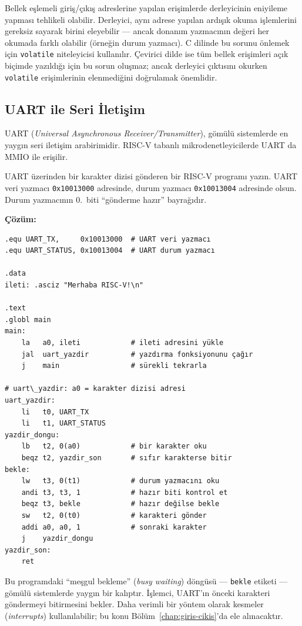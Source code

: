 \begin{bilginot}
Bellek eşlemeli giriş/çıkış adreslerine yapılan erişimlerde derleyicinin eniyileme yapması tehlikeli olabilir. Derleyici, aynı adrese yapılan ardışık okuma işlemlerini gereksiz sayarak birini eleyebilir --- ancak donanım yazmacının değeri her okumada farklı olabilir (örneğin durum yazmacı). C dilinde bu sorunu önlemek için \texttt{volatile} niteleyicisi kullanılır. Çevirici dilde ise tüm bellek erişimleri açık biçimde yazıldığı için bu sorun oluşmaz; ancak derleyici çıktısını okurken \texttt{volatile} erişimlerinin elenmediğini doğrulamak önemlidir.
\end{bilginot}

\subsection{UART ile Seri İletişim}
\label{subsec:uart}

UART (\emph{Universal Asynchronous Receiver/Transmitter}), gömülü sistemlerde en yaygın seri iletişim arabirimidir. RISC-V tabanlı mikrodenetleyicilerde UART da MMIO ile erişilir.

\begin{ornek}[4.19]
\label{orn:uart}
UART üzerinden bir karakter dizisi gönderen bir RISC-V programı yazın. UART veri yazmacı \texttt{0x10013000} adresinde, durum yazmacı \texttt{0x10013004} adresinde olsun. Durum yazmacının 0.\ biti ``gönderme hazır'' bayrağıdır.

\textbf{Çözüm:}

\begin{lstlisting}[style=riscv]
.equ UART_TX,     0x10013000  # UART veri yazmacı
.equ UART_STATUS, 0x10013004  # UART durum yazmacı

.data
ileti: .asciz "Merhaba RISC-V!\n"

.text
.globl main
main:
    la   a0, ileti            # ileti adresini yükle
    jal  uart_yazdir          # yazdırma fonksiyonunu çağır
    j    main                 # sürekli tekrarla

# uart\_yazdir: a0 = karakter dizisi adresi
uart_yazdir:
    li   t0, UART_TX
    li   t1, UART_STATUS
yazdir_dongu:
    lb   t2, 0(a0)            # bir karakter oku
    beqz t2, yazdir_son       # sıfır karakterse bitir
bekle:
    lw   t3, 0(t1)            # durum yazmacını oku
    andi t3, t3, 1            # hazır biti kontrol et
    beqz t3, bekle            # hazır değilse bekle
    sw   t2, 0(t0)            # karakteri gönder
    addi a0, a0, 1            # sonraki karakter
    j    yazdir_dongu
yazdir_son:
    ret
\end{lstlisting}

Bu programdaki ``meşgul bekleme'' (\emph{busy waiting}) döngüsü --- \texttt{bekle} etiketi --- gömülü sistemlerde yaygın bir kalıptır. İşlemci, UART'ın önceki karakteri göndermeyi bitirmesini bekler. Daha verimli bir yöntem olarak kesmeler (\emph{interrupts}) kullanılabilir; bu konu Bölüm~\ref{chap:giris-cikis}'da ele alınacaktır.
\end{ornek}



